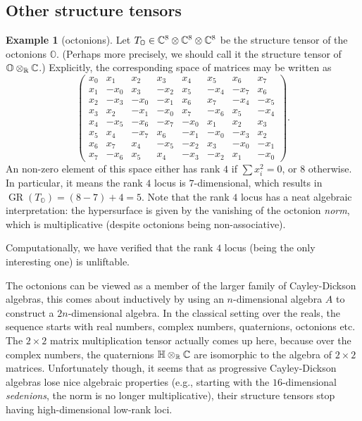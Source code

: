 \documentclass[a4paper,10pt]{article}
\def\oct{\mathbb O}
\def\mtrx#1{\begin{pmatrix}#1\end{pmatrix}}
\DeclareMathOperator{\GR}{GR}
\theoremstyle{definition}
\newtheorem{example}[theorem]{Example}
\theoremstyle{remark}
\begin{document}
\subsection{Other structure tensors}

\begin{example}[octonions]
Let $T_{\oct}\in \ce^8\otimes\ce^8\otimes\ce^8$ be the structure tensor of the octonions $\oct$. (Perhaps more precisely, we should call it the structure tensor of $\oct\otimes_{\er}\ce$.) Explicitly, the corresponding space of matrices may be written as
\[
    \mtrx{
        x_0 &  x_1 &  x_2 &  x_3 &  x_4 &  x_5 &  x_6 &  x_7\\
        x_1 & -x_0 &  x_3 & -x_2 &  x_5 & -x_4 & -x_7 &  x_6\\
        x_2 & -x_3 & -x_0 & -x_1 &  x_6 &  x_7 & -x_4 & -x_5\\
        x_3 &  x_2 & -x_1 & -x_0 &  x_7 & -x_6 &  x_5 & -x_4\\
        x_4 & -x_5 & -x_6 & -x_7 & -x_0 &  x_1 &  x_2 &  x_3\\
        x_5 &  x_4 & -x_7 &  x_6 & -x_1 & -x_0 & -x_3 &  x_2\\
        x_6 &  x_7 &  x_4 & -x_5 & -x_2 &  x_3 & -x_0 & -x_1\\
        x_7 & -x_6 &  x_5 &  x_4 & -x_3 & -x_2 &  x_1 & -x_0
    }.
\]
An non-zero element of this space either has rank $4$ if $\sum x_i^2 = 0$, or $8$ otherwise. In particular, it means the rank $4$ locus is $7$-dimensional, which results in $\GR(T_{\oct}) = (8-7)+4 = 5$. Note that the rank $4$ locus has a neat algebraic interpretation: the hypersurface is given by the vanishing of the octonion \emph{norm}, which is multiplicative (despite octonions being non-associative).

Computationally, we have verified that the rank $4$ locus (being the only interesting one) is unliftable.
\end{example}

The octonions can be viewed as a member of the larger family of Cayley-Dickson algebras, this comes about inductively by using an $n$-dimensional algebra $A$ to construct a $2n$-dimensional algebra. In the classical setting over the reals, the sequence starts with real numbers, complex numbers, quaternions, octonions etc. The $2\times2$ matrix multiplication tensor actually comes up here, because over the complex numbers, the quaternions $\mathbb H\otimes_{\er}\ce$ are isomorphic to the algebra of $2\times 2$ matrices. Unfortunately though, it seems that as progressive Cayley-Dickson algebras lose nice algebraic properties (e.g., starting with the $16$-dimensional \emph{sedenions}, the norm is no longer multiplicative), their structure tensors stop having high-dimensional low-rank loci.
\end{document}
